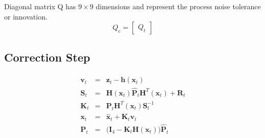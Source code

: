 \documentclass[letterpaper, 10 pt, conference]{ieeeconf}  %
\begin{document}












Diagonal matrix Q has \( 9 \times 9\) dimensions and represent the process
noise tolerance or innovation.
\begin{equation}
Q_{c} =
        \begin{bmatrix}
                Q_{t}
        \end{bmatrix}
\end{equation}

\subsection{Correction Step}
\begin{equation}
\begin{split}\begin{array}{rcl}
        \mathbf{v}_t &=& \mathbf{z}_t - \mathbf{h}(\mathbf{x}_t) \\
        \mathbf{S}_t &=& \mathbf{H}(\mathbf{x}_t) \hat{\mathbf{P}}_t \mathbf{H}^T(\mathbf{x}_t) + \mathbf{R}_t \\
        \mathbf{K}_t &=& \hat{\mathbf{P}}_t \mathbf{H}^T(\mathbf{x}_t) \mathbf{S}_t^{-1} \\
        \mathbf{x}_t &=& \hat{\mathbf{x}}_t + \mathbf{K}_t \mathbf{v}_t \\
        \mathbf{P}_t &=& \big(\mathbf{I}_4 - \mathbf{K}_t\mathbf{H}(\mathbf{x}_t)\big)\hat{\mathbf{P}}_t
\end{array}\end{split}
\end{equation}
\end{document}
